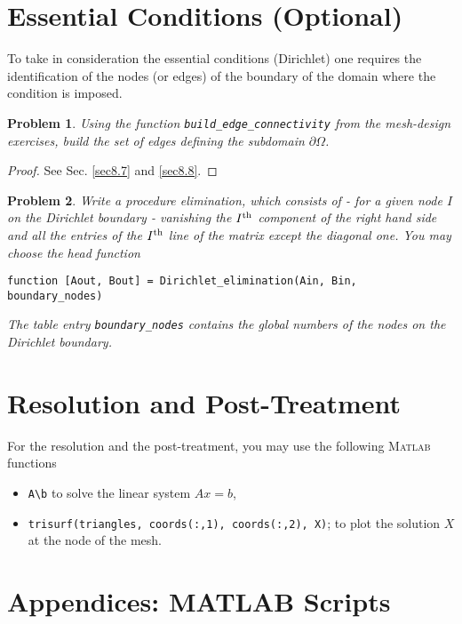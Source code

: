 \documentclass[11pt,a4paper,center,notitlepage]{article}
\numberwithin{equation}{section}
\newtheorem{prob}{Problem}[section]
\begin{document}
\section{Essential Conditions (Optional)}
To take in consideration the essential conditions (Dirichlet) one requires the identification of the nodes (or edges) of the boundary of the domain where the condition is imposed.

\begin{prob}
Using the function \verb|build_edge_connectivity| from the mesh-design exercises, build the set of edges defining the subdomain $\partial \Omega$.
\end{prob}

\begin{proof}
See Sec. \ref{sec8.7} and \ref{sec8.8}.
\end{proof}

\begin{prob}
Write a procedure \emph{elimination}, which consists of - for a given node $I$ on the Dirichlet boundary - vanishing the $I^{\rm th}$ component of the right hand side and all the entries of the $I^{\rm th}$ line of the matrix except the diagonal one. You may choose the head function
\begin{verbatim}
function [Aout, Bout] = Dirichlet_elimination(Ain, Bin, boundary_nodes)
\end{verbatim}
The table entry \verb|boundary_nodes| contains the global numbers of the nodes on the Dirichlet boundary.
\end{prob}

\section{Resolution and Post-Treatment}
For the resolution and the post-treatment, you may use the following \textsc{Matlab} functions
\begin{itemize}
\item \verb|A\b| to solve the linear system $Ax=b$,
\item \verb|trisurf(triangles, coords(:,1), coords(:,2), X)|; to plot the solution $X$ at the node of the mesh.
\end{itemize}


\section{Appendices: MATLAB Scripts}
\end{document}
